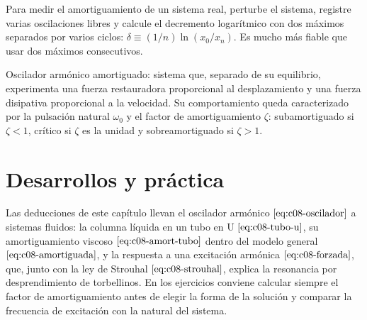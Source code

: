 \documentclass[10pt,openany]{book}
\begin{document}
\begin{tcolorbox}[title={Consejo}, studiumtip, breakable]

Para medir el amortiguamiento de un sistema real, perturbe el sistema, registre varias oscilaciones libres y calcule el decremento logarítmico con dos máximos separados por varios ciclos: \(\delta \equiv (1/n)\ln(x_0/x_n)\). Es mucho más fiable que usar dos máximos consecutivos.
\end{tcolorbox}

\begin{tcolorbox}[title={Definición}, studiumdef, breakable]

Oscilador armónico amortiguado: sistema que, separado de su equilibrio, experimenta una fuerza restauradora proporcional al desplazamiento y una fuerza disipativa proporcional a la velocidad. Su comportamiento queda caracterizado por la pulsación natural \(\omega_0\) y el factor de amortiguamiento \(\zeta\): subamortiguado si \(\zeta < 1\), crítico si \(\zeta\) es la unidad y sobreamortiguado si \(\zeta > 1\).
\end{tcolorbox}



\section{Desarrollos y práctica}

Las deducciones de este capítulo llevan el oscilador armónico \(\eqref{eq:c08-oscilador}\) a sistemas fluidos: la columna líquida en un tubo en U \(\eqref{eq:c08-tubo-u}\), su amortiguamiento viscoso \(\eqref{eq:c08-amort-tubo}\) dentro del modelo general \(\eqref{eq:c08-amortiguada}\), y la respuesta a una excitación armónica \(\eqref{eq:c08-forzada}\), que, junto con la ley de Strouhal \(\eqref{eq:c08-strouhal}\), explica la resonancia por desprendimiento de torbellinos. En los ejercicios conviene calcular siempre el factor de amortiguamiento antes de elegir la forma de la solución y comparar la frecuencia de excitación con la natural del sistema.
\end{document}

